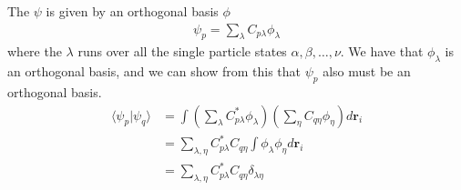 \documentclass[11pt,twocolumn]{article}
\begin{document}
The $\psi$ is given by an orthogonal basis $\phi$
\begin{align}
	\psi_p = \sum_\lambda C_{p\lambda} \phi_\lambda
	\label{eq:basis-orthogonality}
\end{align}
where the $\lambda$ runs over all the single particle states $\alpha, \beta, \dots, \nu$. We have that $\phi_\lambda$ is an orthogonal basis, and we can show from this that $\psi_p$ also must be an orthogonal basis.
\begin{align*}
	\langle \psi_p | \psi_q \rangle &= \int \left( \sum_\lambda C^*_{p\lambda}\phi_\lambda \right) \left( \sum_\eta C_{q\eta}\phi_\eta \right) d\mathbf{r}_i \\
	&= \sum_{\lambda,\eta} C^*_{p\lambda} C_{q\eta} \int \phi_\lambda \phi_\eta d\mathbf{r}_i \\
	&= \sum_{\lambda,\eta} C^*_{p\lambda} C_{q\eta} \delta_{\lambda\eta}
\end{align*}
\end{document}

